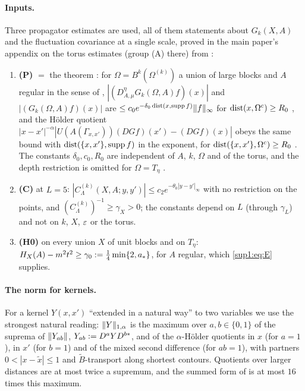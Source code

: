 \paragraph{Inputs.} Three propagator estimates are used, all of them statements about $G_k(X,A)$ and the fluctuation covariance at a single scale, proved in the main paper's appendix on the torus estimates (group (A) there) from \cite{Ba4}:
\begin{enumerate}[label=\textup{(\roman*)},nosep,leftmargin=*]
\item \textbf{(P)} \cite[Prop.~2.1]{Ba1} $=$ the theorem \cite[(1.9)--(1.12)]{Ba4}: for $\Omega=B^k(\Omega^{(k)})$ a union of large blocks and $A$ regular in the sense of \cite[(2.23)]{Ba1}, $|(D^\eta_{A,\mu}G_k(\Omega,A)f)(x)|$ and $|(G_k(\Omega,A)f)(x)|$ are $\le c_0e^{-\delta_0\operatorname{dist}(x,\operatorname{supp} f)}\lVert f\rVert_\infty$ for $\operatorname{dist}(x,\Omega^c)\ge R_0$ \cite[(2.25)]{Ba1}, and the H\"older quotient $|x-x'|^{-\alpha}|U(A(\Gamma_{x,x'}))(DGf)(x')-(DGf)(x)|$ obeys the same bound with $\operatorname{dist}(\{x,x'\},\operatorname{supp} f)$ in the exponent, for $\operatorname{dist}(\{x,x'\},\Omega^c)\ge R_0$ \cite[(2.24)]{Ba1}. The constants $\delta_0,c_0,R_0$ are independent of $A$, $k$, $\Omega$ and of the torus, and the depth restriction is omitted for $\Omega=T_\eta$ \cite[pp.~610--611]{Ba1}.
\item \textbf{(C)} \cite[Prop.~2.3, (2.33)--(2.34)]{Ba1} at $L=5$: $|C^{(k)}_\Lambda(X,A;y,y')|\le c_2e^{-\theta_0|y-y'|_\infty}$ with no restriction on the points, and $(C^{(k)}_\Lambda)^{-1}\ge\gamma_X>0$; the constants depend on $L$ (through $\gamma_L$) and not on $k$, $X$, $\varepsilon$ or the torus.
\item \textbf{(H0)} \cite[(1.8)]{Ba4} on every union $X$ of unit blocks and on $T_\eta$: $H_X(A)-m^2t^2\ge\gamma_0:=\frac14\min\{2,a_*\}$, for $A$ regular, which \eqref{sup1:eq:E} supplies.
\end{enumerate}

\paragraph{The norm \cite[(1.32)]{Ba3} for kernels.} For a kernel $Y(x,x')$ ``extended in a natural way'' to two variables \cite[p.~420]{Ba3} we use the strongest natural reading: $\lVert Y\rVert_{1,\alpha}$ is the maximum over $a,b\in\{0,1\}$ of the suprema of $\lVert Y_{ab}\rVert$, $Y_{ab}:= D^aYD^{b*}$, and of the $\alpha$-H\"older quotients in $x$ (for $a=1$), in $x'$ (for $b=1$) and of the mixed second difference (for $ab=1$), with partners $0<|x-\tilde x|\le1$ and $\tilde B$-transport along shortest contours. Quotients over larger distances are at most twice a supremum, and the summed form of \cite[(1.32)]{Ba3} is at most $16$ times this maximum.
